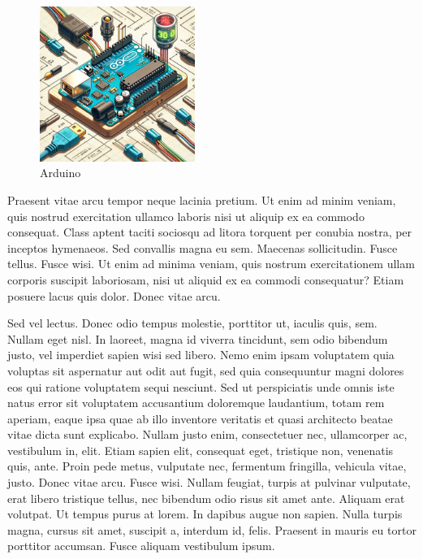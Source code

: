 \begin{figure}[h]
    \centering
    \includegraphics[width=0.45\textwidth]{images/arduino.jpg}
    \caption{Arduino}
    \label{fig:arduino}
\end{figure}

Praesent vitae arcu tempor neque lacinia pretium. Ut enim ad minim veniam, quis nostrud exercitation ullamco laboris nisi ut aliquip ex ea commodo consequat. Class aptent taciti sociosqu ad litora torquent per conubia nostra, per inceptos hymenaeos. Sed convallis magna eu sem. Maecenas sollicitudin. Fusce tellus. Fusce wisi. Ut enim ad minima veniam, quis nostrum exercitationem ullam corporis suscipit laboriosam, nisi ut aliquid ex ea commodi consequatur? Etiam posuere lacus quis dolor. Donec vitae arcu.

Sed vel lectus. Donec odio tempus molestie, porttitor ut, iaculis quis, sem. Nullam eget nisl. In laoreet, magna id viverra tincidunt, sem odio bibendum justo, vel imperdiet sapien wisi sed libero. Nemo enim ipsam voluptatem quia voluptas sit aspernatur aut odit aut fugit, sed quia consequuntur magni dolores eos qui ratione voluptatem sequi nesciunt. Sed ut perspiciatis unde omnis iste natus error sit voluptatem accusantium doloremque laudantium, totam rem aperiam, eaque ipsa quae ab illo inventore veritatis et quasi architecto beatae vitae dicta sunt explicabo. Nullam justo enim, consectetuer nec, ullamcorper ac, vestibulum in, elit. Etiam sapien elit, consequat eget, tristique non, venenatis quis, ante. Proin pede metus, vulputate nec, fermentum fringilla, vehicula vitae, justo. Donec vitae arcu. Fusce wisi. Nullam feugiat, turpis at pulvinar vulputate, erat libero tristique tellus, nec bibendum odio risus sit amet ante. Aliquam erat volutpat. Ut tempus purus at lorem. In dapibus augue non sapien. Nulla turpis magna, cursus sit amet, suscipit a, interdum id, felis. Praesent in mauris eu tortor porttitor accumsan. Fusce aliquam vestibulum ipsum.

